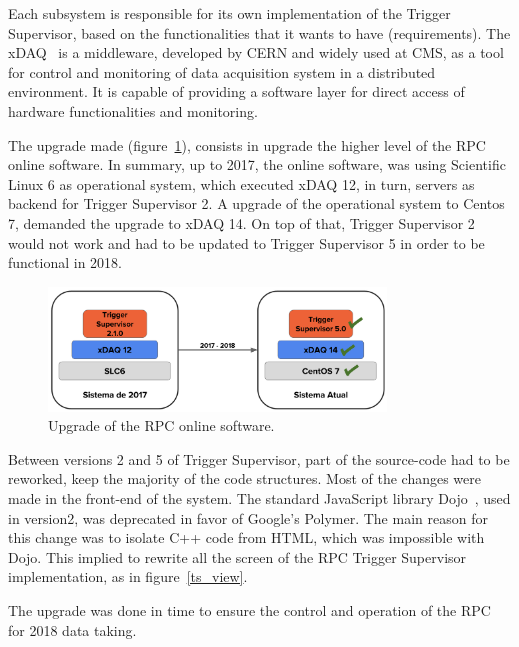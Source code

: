 Each subsystem is responsible for its own implementation of the Trigger Supervisor, based on the functionalities that it wants to have (requirements). The xDAQ~\cite{xdaq} is a middleware, developed by CERN and widely used at CMS, as a tool for control and monitoring of data acquisition system in a distributed environment. It is capable of providing a software layer for direct access of hardware functionalities and monitoring.

The upgrade made (figure~\ref{ts_upgrade}), consists in upgrade the higher level of the RPC online software. In summary, up to 2017, the online software, was using Scientific Linux 6 as operational system, which executed xDAQ 12, in turn, servers as backend for Trigger Supervisor 2. A upgrade of the operational system to Centos 7, demanded the upgrade to xDAQ 14. On top of that, Trigger Supervisor 2 would not work and had to be updated to Trigger Supervisor 5 in order to be functional in 2018.

\begin{figure}[h]
\begin{center}
\includegraphics[width=0.8\textwidth,keepaspectratio]{figures/rpc/ts_upgrade.png}
\end{center}
\caption{Upgrade of the RPC online software.}\label{ts_upgrade}
\end{figure}

Between versions 2 and 5 of Trigger Supervisor, part of the source-code had to be reworked, keep the majority of the code structures. Most of the changes were made in the front-end of the system. The standard JavaScript library Dojo~\cite{dojo}, used in version2, was deprecated in favor of Google's Polymer\cite{polymer}. The main reason for this change was to isolate C++ code from HTML, which was impossible with Dojo. This implied to rewrite all the screen of the RPC Trigger Supervisor implementation, as in figure~\ref{ts_view}.

The upgrade  was done in time to ensure the control and operation of the RPC for 2018 data taking.


